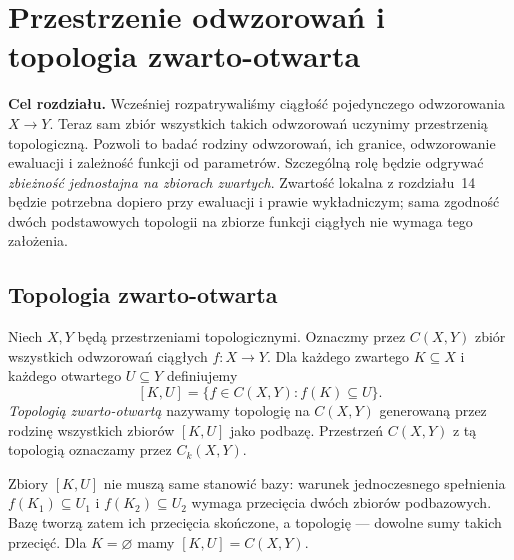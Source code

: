 \chapter{Przestrzenie odwzorowań i topologia zwarto-otwarta}
\label{ch:topog-przestrzenie-odwzorowan}

\providecommand{\atlasref}[2]{#2}

\noindent\textbf{Cel rozdziału.}
Wcześniej rozpatrywaliśmy ciągłość pojedynczego
odwzorowania $X\to Y$.
Teraz sam zbiór wszystkich takich odwzorowań
uczynimy przestrzenią topologiczną.
Pozwoli to badać rodziny odwzorowań, ich granice,
odwzorowanie ewaluacji i zależność funkcji
od parametrów. Szczególną rolę będzie odgrywać
\emph{zbieżność jednostajna na zbiorach zwartych}.
Zwartość lokalna z rozdziału~14 będzie potrzebna
dopiero przy ewaluacji i prawie wykładniczym;
sama zgodność dwóch podstawowych topologii
na zbiorze funkcji ciągłych nie wymaga
tego założenia.

\section{Topologia zwarto-otwarta}
\label{sec:topog-odwzorowania-zwarto-otwarta}

\begin{definicja}
\label{def:topog-odwzorowania-Ck}
Niech $X,Y$ będą przestrzeniami topologicznymi.
Oznaczmy przez $C(X,Y)$ zbiór wszystkich
odwzorowań ciągłych $f\colon X\to Y$.
Dla każdego zwartego $K\subseteq X$
i każdego otwartego $U\subseteq Y$
definiujemy
\[
[K,U]=\{f\in C(X,Y):f(K)\subseteq U\}.
\]
\emph{Topologią zwarto-otwartą}
nazywamy topologię na $C(X,Y)$
generowaną przez rodzinę wszystkich
zbiorów $[K,U]$ jako podbazę.
Przestrzeń $C(X,Y)$ z tą topologią
oznaczamy przez $C_k(X,Y)$.
\end{definicja}

\begin{uwaga}
Zbiory $[K,U]$ nie muszą same
stanowić bazy: warunek jednoczesnego
spełnienia $f(K_1)\subseteq U_1$
i $f(K_2)\subseteq U_2$ wymaga
przecięcia dwóch zbiorów podbazowych.
Bazę tworzą zatem ich przecięcia
skończone, a topologię --- dowolne sumy
takich przecięć. Dla $K=\varnothing$
mamy $[K,U]=C(X,Y)$.
\end{uwaga}

